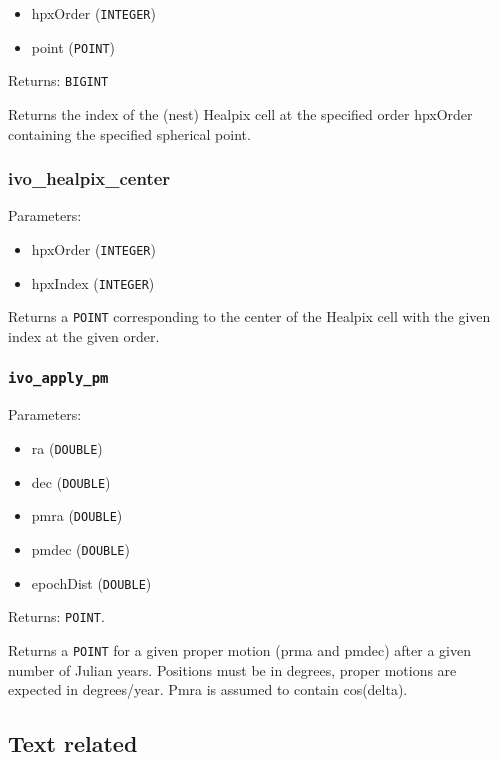 \documentclass[11pt,a4paper]{ivoa}
\begin{document}
\begin{itemize}
	\item hpxOrder (\texttt{INTEGER})
	\item point (\texttt{POINT})
\end{itemize}

Returns: \texttt{BIGINT}

Returns the index of the (nest) Healpix cell at the specified order
hpxOrder containing the specified spherical point.

\subsubsection{ivo\_healpix\_center}

Parameters:

\begin{itemize}
	\item hpxOrder (\texttt{INTEGER})
	\item hpxIndex (\texttt{INTEGER})
\end{itemize}

Returns a \texttt{POINT} corresponding to the center of the Healpix cell
with the given index at the given order.

\subsubsection{\texttt{ivo\_apply\_pm}}

Parameters:

\begin{itemize}
	\item ra (\texttt{DOUBLE})
	\item dec (\texttt{DOUBLE})
	\item pmra (\texttt{DOUBLE})
	\item pmdec (\texttt{DOUBLE})
	\item epochDist (\texttt{DOUBLE})
\end{itemize}

Returns: \texttt{POINT}.

Returns a \texttt{POINT} for a given proper motion (prma and pmdec)
after a given number of Julian years. Positions must be in degrees,
proper motions are expected in degrees/year. Pmra is assumed to contain
cos(delta).

\subsection{Text related}
\end{document}
